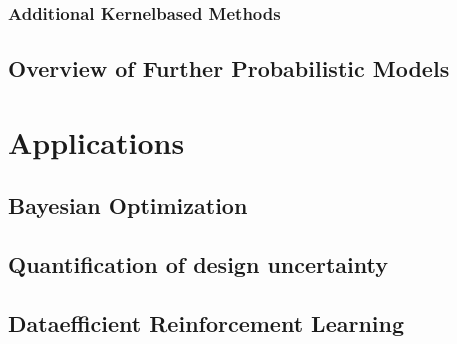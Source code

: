 \documentclass[letterpaper,10pt,english]{jupyterBook}
\begin{document}
\section{Additional Kernel\sphinxhyphen{}based Methods}
\label{\detokenize{probML/kernelmethods:additional-kernel-based-methods}}

\chapter{Overview of Further Probabilistic Models}
\label{\detokenize{probML/overview:overview-of-further-probabilistic-models}}\label{\detokenize{probML/overview::doc}}

\part{Applications}


\chapter{Bayesian Optimization}
\label{\detokenize{appl/BO:bayesian-optimization}}\label{\detokenize{appl/BO::doc}}

\chapter{Quantification of design uncertainty}
\label{\detokenize{appl/uncertainty:quantification-of-design-uncertainty}}\label{\detokenize{appl/uncertainty::doc}}

\chapter{Data\sphinxhyphen{}efficient Reinforcement Learning}
\label{\detokenize{appl/RL:data-efficient-reinforcement-learning}}\label{\detokenize{appl/RL::doc}}






\renewcommand{\indexname}{Index}
\printindex
\end{document}
